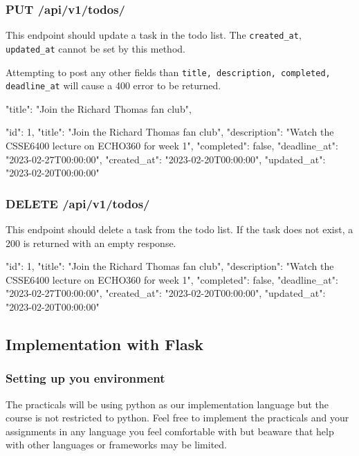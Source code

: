 \documentclass{csse4400}
\begin{document}
\subsubsection{PUT /api/v1/todos/}
This endpoint should update a task in the todo list. The \texttt{created\_at}, \texttt{updated\_at} cannot be set by this method.

Attempting to post any other fields than \texttt{title, description, completed, deadline\_at} will cause a 400 error to be returned.

\begin{code}[language=json,numbers=none]{}
  {
    "title": "Join the Richard Thomas fan club",
  }
\end{code}

\begin{code}[language=json,numbers=none]{}
  {
    "id": 1,
    "title": "Join the Richard Thomas fan club",
    "description": "Watch the CSSE6400 lecture on ECHO360 for week 1",
    "completed": false,
    "deadline_at": "2023-02-27T00:00:00",
    "created_at": "2023-02-20T00:00:00",
    "updated_at": "2023-02-20T00:00:00"
  }
\end{code}

\subsubsection{DELETE /api/v1/todos/}
This endpoint should delete a task from the todo list. If the task does not exist, a 200 is returned with an empty response.

\begin{code}[language=json,numbers=none]{}
  {
    "id": 1,
    "title": "Join the Richard Thomas fan club",
    "description": "Watch the CSSE6400 lecture on ECHO360 for week 1",
    "completed": false,
    "deadline_at": "2023-02-27T00:00:00",
    "created_at": "2023-02-20T00:00:00",
    "updated_at": "2023-02-20T00:00:00"
  }
\end{code}


\subsection{Implementation with Flask}

\subsubsection{Setting up you environment}

The practicals will be using python as our implementation language but the course is not restricted to python. Feel free to implement the practicals and your assignments in any language you feel comfortable with but beaware that help with other languages or frameworks may be limited.
\end{document}

